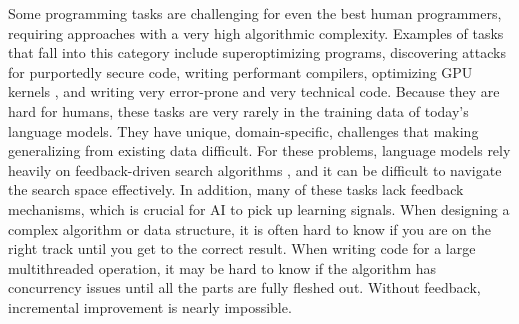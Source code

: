 Some programming tasks are challenging for even the best human programmers, requiring approaches with a very high algorithmic complexity. Examples of tasks that fall into this category include superoptimizing programs, discovering attacks for purportedly secure code, writing performant compilers, optimizing GPU kernels \citep{ouyang2024kernelbench}, and writing very error-prone and very technical code. 
%
%
%
Because they are hard for humans, these tasks are very rarely in the training data of today's language models. They have unique, domain-specific, challenges that making generalizing from existing data difficult. For these problems, language models rely heavily on feedback-driven search algorithms \citep{mankowitz2023faster}, and it can be difficult to navigate the search space effectively. In addition, many of these tasks lack feedback mechanisms, which is crucial for AI to pick up learning signals. When designing a complex algorithm or data structure, it is often hard to know if you are on the right track until you get to the correct result. When writing code for a large multithreaded operation, it may be hard to know if the algorithm has concurrency issues until all the parts are fully fleshed out. Without feedback, incremental improvement is nearly impossible.


